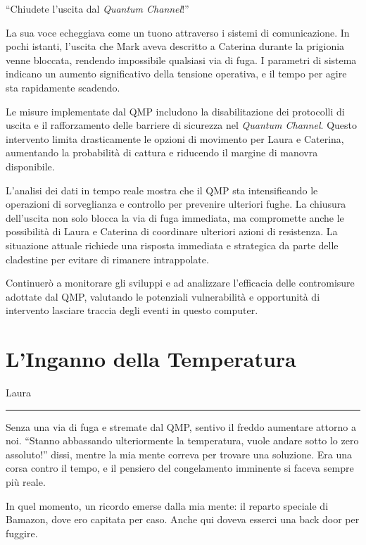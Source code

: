 \begin{dialogue}
 \enquote{Chiudete l'uscita dal \textit{Quantum Channel}!}
\end{dialogue}
La sua voce echeggiava come un tuono attraverso i sistemi di comunicazione. In pochi istanti, l'uscita che Mark aveva descritto a Caterina durante la prigionia venne bloccata, rendendo impossibile qualsiasi via di fuga. I parametri di sistema indicano un aumento significativo della tensione operativa, e il tempo per agire sta rapidamente scadendo.

Le misure implementate dal QMP includono la disabilitazione dei protocolli di uscita e il rafforzamento delle barriere di sicurezza nel \textit{Quantum Channel}. Questo intervento limita drasticamente le opzioni di movimento per Laura e Caterina, aumentando la probabilità di cattura e riducendo il margine di manovra disponibile.

L'analisi dei dati in tempo reale mostra che il QMP sta intensificando le operazioni di sorveglianza e controllo per prevenire ulteriori fughe. La chiusura dell'uscita non solo blocca la via di fuga immediata, ma compromette anche le possibilità di Laura e Caterina di coordinare ulteriori azioni di resistenza. La situazione attuale richiede una risposta immediata e strategica da parte delle cladestine per evitare di rimanere intrappolate.

Continuerò a monitorare gli sviluppi e ad analizzare l'efficacia delle contromisure adottate dal QMP, valutando le potenziali vulnerabilità e opportunità di intervento lasciare traccia degli eventi in questo computer.

\newpage
\section{L'Inganno della Temperatura}
\vspace{1em}
\begin{center}Laura\end{center}
\hrule
\vspace{1em}
Senza una via di fuga e stremate dal QMP, sentivo il freddo aumentare attorno a noi. “Stanno abbassando ulteriormente la temperatura, vuole andare sotto lo zero assoluto!” dissi, mentre la mia mente correva per trovare una soluzione. Era una corsa contro il tempo, e il pensiero del congelamento imminente si faceva sempre più reale.

In quel momento, un ricordo emerse dalla mia mente: il reparto speciale di Bamazon, dove ero capitata per caso. Anche qui doveva esserci una back door per fuggire.

